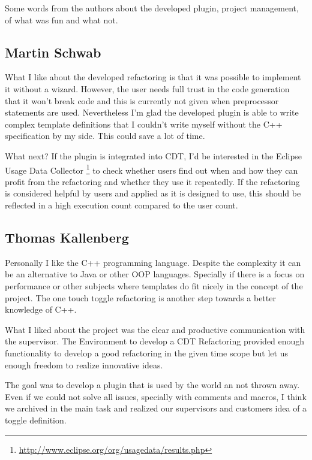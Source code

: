 Some words from the authors about the developed plugin, project management, of 
what was fun and what not.

\subsection{Martin Schwab}

What I like about the developed refactoring is that it was possible to implement 
it without a wizard. However, the user needs full trust in the code generation 
that it won't break code and this is currently not given when preprocessor 
statements are used. Nevertheless I'm glad the developed plugin is able to write 
complex template definitions that I couldn't write myself without the C++ 
specification by my side. This could save a lot of time.

What next? If the plugin is integrated into CDT, I'd be interested in the 
Eclipse Usage Data Collector
\footnote{\url{http://www.eclipse.org/org/usagedata/results.php}} to check 
whether users find out when and how they can profit from the refactoring and 
whether they use it repeatedly. If the refactoring is considered helpful by 
users and applied as it is designed to use, this should be reflected in a high 
execution count compared to the user count.

\subsection{Thomas Kallenberg}

Personally I like the C++ programming language. Despite the complexity it can
be an alternative to Java or other OOP languages. Specially if there is a focus
on performance or other subjects where templates do fit nicely in the concept
of the project.
The one touch toggle refactoring is another step towards a better knowledge of
C++.

What I liked about the project was the clear and productive communication with
the supervisor. The Environment to develop a CDT Refactoring provided enough
functionality to develop a good refactoring in the given time scope but let us
enough freedom to realize innovative ideas.

The goal was to develop a plugin that is used by the world an not thrown away.
Even if we could not solve all issues, specially with comments and macros, I
think we archived in the main task and realized our supervisors and customers 
idea of a toggle definition.


